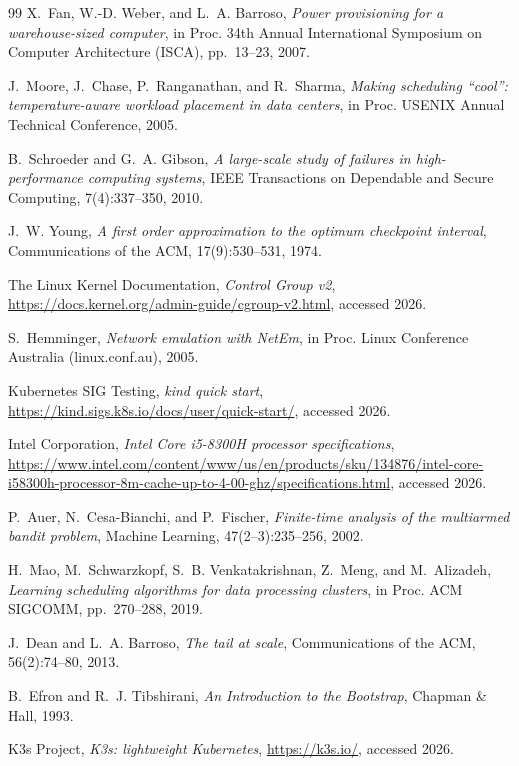 \documentclass[12pt,a4paper]{report}
\begin{document}
\begin{thebibliography}{99}
X.~Fan, W.-D. Weber, and L.~A. Barroso, \emph{Power provisioning for a
warehouse-sized computer}, in Proc. 34th Annual International Symposium
on Computer Architecture (ISCA), pp.~13--23, 2007.

J.~Moore, J.~Chase, P.~Ranganathan, and R.~Sharma, \emph{Making scheduling
``cool'': temperature-aware workload placement in data centers}, in Proc.
USENIX Annual Technical Conference, 2005.

B.~Schroeder and G.~A. Gibson, \emph{A large-scale study of failures in
high-performance computing systems}, IEEE Transactions on Dependable and
Secure Computing, 7(4):337--350, 2010.

J.~W. Young, \emph{A first order approximation to the optimum checkpoint
interval}, Communications of the ACM, 17(9):530--531, 1974.

The Linux Kernel Documentation, \emph{Control Group v2},
\url{https://docs.kernel.org/admin-guide/cgroup-v2.html}, accessed 2026.

S.~Hemminger, \emph{Network emulation with NetEm}, in Proc. Linux
Conference Australia (linux.conf.au), 2005.

Kubernetes SIG Testing, \emph{kind quick start},
\url{https://kind.sigs.k8s.io/docs/user/quick-start/}, accessed 2026.

Intel Corporation, \emph{Intel Core i5-8300H processor specifications},
\url{https://www.intel.com/content/www/us/en/products/sku/134876/intel-core-i58300h-processor-8m-cache-up-to-4-00-ghz/specifications.html},
accessed 2026.

P.~Auer, N.~Cesa-Bianchi, and P.~Fischer, \emph{Finite-time analysis of
the multiarmed bandit problem}, Machine Learning, 47(2--3):235--256, 2002.

H.~Mao, M.~Schwarzkopf, S.~B. Venkatakrishnan, Z.~Meng, and M.~Alizadeh,
\emph{Learning scheduling algorithms for data processing clusters}, in
Proc. ACM SIGCOMM, pp.~270--288, 2019.

J.~Dean and L.~A. Barroso, \emph{The tail at scale}, Communications of
the ACM, 56(2):74--80, 2013.

B.~Efron and R.~J. Tibshirani, \emph{An Introduction to the Bootstrap},
Chapman \& Hall, 1993.

K3s Project, \emph{K3s: lightweight Kubernetes}, \url{https://k3s.io/},
accessed 2026.

\end{thebibliography}
\end{document}
